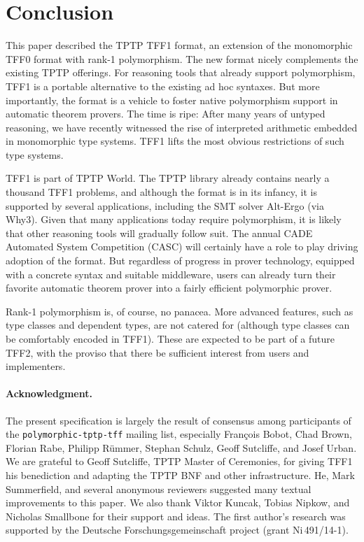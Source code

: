 \section{Conclusion}
\label{sec_concl}

This paper described the TPTP TFF1 format, an extension of the monomorphic TFF0 format
with rank-1 polymorphism. The new format nicely complements the existing TPTP
offerings. %
For reasoning tools that already
support polymorphism, TFF1 is a portable alternative to the existing ad hoc
syntaxes. But more importantly, the format is a vehicle to foster native
polymorphism support in automatic theorem provers. The time is ripe: After many
years of untyped reasoning, we have recently witnessed the rise of
interpreted arithmetic embedded in monomorphic type systems. TFF1
lifts the most obvious restrictions of such type systems.

TFF1 is part of TPTP World. The TPTP library already contains
nearly a thousand TFF1 problems, and although the format is in its
infancy, it is supported by several applications, including the SMT solver
Alt-Ergo (via Why3).
Given that many applications today require polymorphism, it
is likely that other reasoning tools will gradually follow suit.
The annual CADE Automated
System Competition (CASC) will certainly have a
role to play driving adoption of the format. But regardless of progress in
prover technology, equipped with a concrete syntax and suitable middleware,
users can already turn their favorite automatic theorem prover into a
fairly efficient polymorphic prover.

Rank-1 polymorphism is, of course, no panacea. More advanced features, such as
type classes and dependent types, are not catered for (although type
classes can be comfortably encoded in TFF1). These are expected to be
part of a future TFF2, with the proviso that there be sufficient interest from
users and implementers.

\def\ackname{Acknowledgment}
\paragraph{\textbf{\upshape\ackname.}}
%
The present specification is largely the result of consensus among
participants of the {\tt polymorphic-tptp-tff} mailing list, especially
Fran\c{c}ois Bobot, Chad Brown, Florian Rabe, Philipp R\"ummer, Stephan Schulz,
Geoff Sutcliffe, and Josef Urban.
We are grateful to Geoff Sutcliffe, TPTP Master of Ceremonies, for giving TFF1
his benediction and adapting the TPTP BNF and other infrastructure.
He, Mark Summerfield, and several anonymous reviewers suggested many textual
improvements to this paper. We also thank Viktor Kuncak, Tobias Nipkow, and
Nicholas Smallbone for their support and ideas.
%
The first author's research was supported by the Deutsche
Forschungs\-gemein\-schaft project  (grant
Ni\,491\slash 14-1).
%
